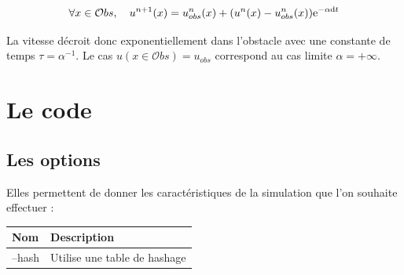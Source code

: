 		\begin{equation}
			\forall x \in \mathcal{O}bs, \ \ \
			u^{n+1}(x)= u^n_{obs}(x) + (u^n(x)-u^n_{obs}(x))\mathrm{e}^{-\alpha\mathrm{d}t}
			\label{penalisation}
		\end{equation}
		
		La vitesse décroit donc exponentiellement dans l'obstacle avec une constante de temps $\tau= \alpha^{-1}$. Le cas $u(x\in \mathcal{O}bs)=u_{obs}$ correspond au cas limite $\alpha = +\infty$.


\section{Le code}

	\subsection{Les options}
		
		Elles permettent de donner les caractéristiques de la simulation que l'on souhaite effectuer :
			\begin{tabular}{|l | l|}
				Nom & Description\\
				\hline
				--hash & Utilise une table de hashage\\
				\hline
				
			\end{tabular}
		

